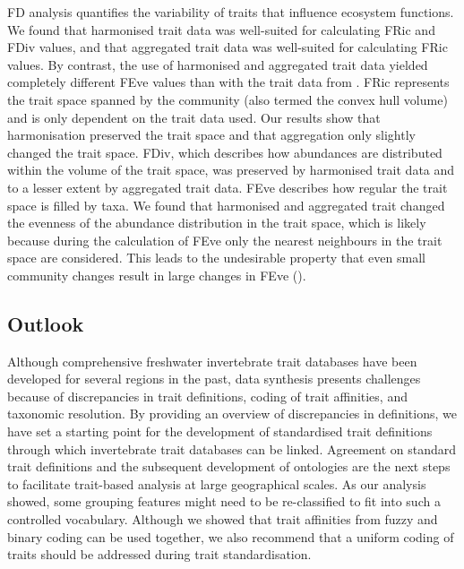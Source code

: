 \documentclass[12pt]{article}
\begin{document}
FD analysis quantifies the variability of traits that influence ecosystem functions. We found that harmonised trait data was well-suited for calculating FRic and FDiv values, and that aggregated trait data was well-suited for calculating FRic values. By contrast, the use of harmonised and aggregated trait data yielded completely different FEve values than with the trait data from \citet{szocs_effects_2014}. FRic represents the trait space spanned by the community (also termed the convex hull volume) and is only dependent on the trait data used. Our results show that harmonisation preserved the trait space and that aggregation only slightly changed the trait space. FDiv, which describes how abundances are distributed within the volume of the trait space, was preserved by harmonised trait data and to a lesser extent by aggregated trait data. FEve describes how regular the trait space is filled by taxa. We found that harmonised and aggregated trait changed the evenness of the abundance distribution in the trait space, which is likely because during the calculation of FEve only the nearest neighbours in the trait space are considered. This leads to the undesirable property that even small community changes result in large changes in FEve (\cite{botta-dukatTestingAbilityFunctional2016}).   
 

\subsection*{Outlook}

Although comprehensive freshwater invertebrate trait databases have been developed for several regions in the past, data synthesis presents challenges because of discrepancies in trait definitions, coding of trait affinities, and taxonomic resolution. By providing an overview of discrepancies in definitions, we have set a starting point for the development of standardised trait definitions through which invertebrate trait databases can be linked. Agreement on standard trait definitions and the subsequent development of ontologies are the next steps to facilitate trait-based analysis at large geographical scales. As our analysis showed, some grouping features might need to be re-classified to fit into such a controlled vocabulary. Although we showed that trait affinities from fuzzy and binary coding can be used together, we also recommend that a uniform coding of traits should be addressed during trait standardisation. 
\end{document}
